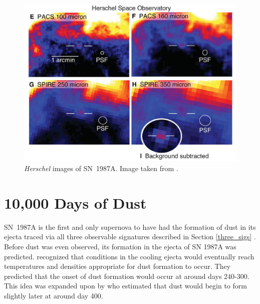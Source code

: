 \begin{figure}
\centering
\includegraphics[clip=true,scale=0.35,trim= 0 0 0 0]{chapters/chapter5/images/Herschel_img.png}
\caption{\textit{Herschel} images of SN~1987A.  Image taken from \citep{Matsuura2011}.}
\label{Herschel_img}
\end{figure}

\section{10,000 Days of Dust}
SN~1987A is the first and only supernova to have had the formation of dust in its ejecta traced via all three observable signatures described in Section \ref{three_sigs} \citep{Bouchet2014}.  Before dust was even observed, its formation in the ejecta of SN 1987A was predicted.  \citet{Gehrz1987} recognized that conditions in the cooling ejecta would eventually reach temperatures and densities appropriate for dust formation to occur.  They predicted that the onset of dust formation would occur at around days 240-300.  This idea was expanded upon by \citet{Dwek1988} who estimated that dust would begin to form slightly later at around day 400.


